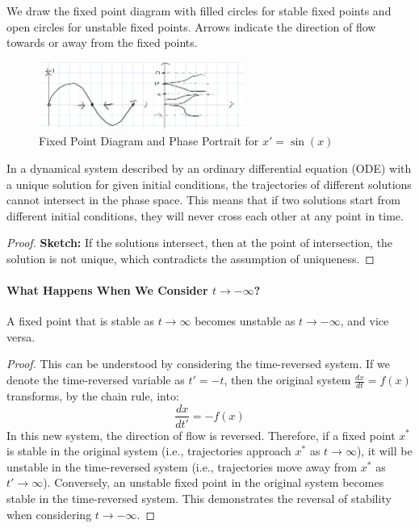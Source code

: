 \documentclass[11pt]{article}
\begin{document}
We draw the fixed point diagram with filled circles for stable fixed points and open circles for unstable fixed points. Arrows indicate the direction of flow towards or away from the fixed points.

\begin{figure}[h!]
    \centering
    \includegraphics[width=0.6\textwidth]{fixpointdiagram.jpeg}
    \caption{Fixed Point Diagram and Phase Portrait for \( x' = \sin(x) \)}
    \label{fig:fixpointdiagram}
\end{figure}

\begin{theorem}
    In a dynamical system described by an ordinary differential equation (ODE) with a unique solution for given initial conditions, the trajectories of different solutions cannot intersect in the phase space. This means that if two solutions start from different initial conditions, they will never cross each other at any point in time.
\end{theorem}
\begin{proof}
    \textbf{Sketch:} If the solutions intersect, then at the point of intersection, the solution is not unique, which contradicts the assumption of uniqueness.
\end{proof}


\paragraph{What Happens When We Consider $t \to -\infty$?} 
\begin{theorem}
    A fixed point that is stable as \( t \to \infty \) becomes unstable as \( t \to -\infty \), and vice versa.
\end{theorem}

\begin{proof}
    This can be understood by considering the time-reversed system. If we denote the time-reversed variable as \( t' = -t \), then the original system \( \frac{dx}{dt} = f(x) \) transforms, by the chain rule, into:
    $$
    \frac{dx}{dt'} = -f(x) 
    $$
    In this new system, the direction of flow is reversed. Therefore, if a fixed point \( x^* \) is stable in the original system (i.e., trajectories approach \( x^* \) as \( t \to \infty \)), it will be unstable in the time-reversed system (i.e., trajectories move away from \( x^* \) as \( t' \to \infty \)). Conversely, an unstable fixed point in the original system becomes stable in the time-reversed system. This demonstrates the reversal of stability when considering \( t \to -\infty \).
\end{proof}
    
\end{document}
